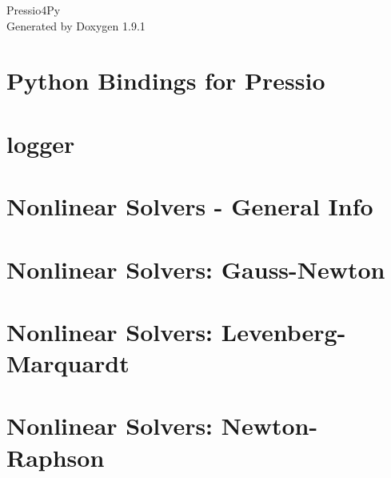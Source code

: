 \let\mypdfximage\pdfximage\def\pdfximage{\immediate\mypdfximage}\documentclass[twoside]{book}
\newcommand{\+}{\discretionary{\mbox{\scriptsize$\hookleftarrow$}}{}{}}
\newcommand{\clearemptydoublepage}{%
  \newpage{\pagestyle{empty}\cleardoublepage}%
}
\begin{document}
\raggedbottom

\hypersetup{pageanchor=false,
             bookmarksnumbered=true,
             pdfencoding=unicode
            }
\begin{titlepage}
\vspace*{7cm}
\begin{center}%
{\Large Pressio4\+Py }\\
\vspace*{1cm}
{\large Generated by Doxygen 1.9.1}\\
\end{center}
\end{titlepage}
\clearemptydoublepage
{}
\tableofcontents
\clearemptydoublepage
{}
\hypersetup{pageanchor=true}

\chapter{Python Bindings for Pressio}
\label{index}\hypertarget{index}{}
\chapter{logger}
\label{md_pages_components_logger}

\chapter{Nonlinear Solvers -\/ General Info}
\label{md_pages_components_nonlinsolvers_general}

\chapter{Nonlinear Solvers\+: Gauss-\/\+Newton}
\label{md_pages_components_nonlinsolvers_gn}

\chapter{Nonlinear Solvers\+: Levenberg-\/\+Marquardt}
\label{md_pages_components_nonlinsolvers_lm}

\chapter{Nonlinear Solvers\+: Newton-\/\+Raphson}
\label{md_pages_components_nonlinsolvers_nr}

\end{document}
